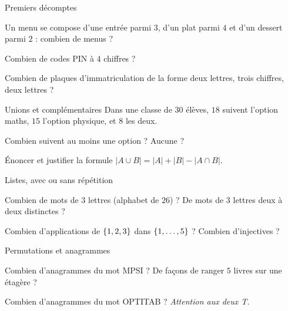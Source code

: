 \exercices
{}

\begin{exercice}[1]{Premiers décomptes}
\begin{questions}
  \item Un menu se compose d'une entrée parmi $3$, d'un plat parmi $4$ et
    d'un dessert parmi $2$ : combien de menus ?
  \item Combien de codes PIN à $4$ chiffres ?
  \item Combien de plaques d'immatriculation de la forme
    deux lettres, trois chiffres, deux lettres ?
\end{questions}
\end{exercice}

\begin{exercice}[1]{Unions et complémentaires}
Dans une classe de $30$ élèves, $18$ suivent l'option maths, $15$ l'option
physique, et $8$ les deux.
\begin{questions}
  \item Combien suivent au moins une option ? Aucune ?
  \item Énoncer et justifier la formule $|A\cup B|=|A|+|B|-|A\cap B|$.
\end{questions}
\end{exercice}

\begin{exercice}[1]{Listes, avec ou sans répétition}
\begin{questions}
  \item Combien de mots de $3$ lettres (alphabet de $26$) ? De mots de
    $3$ lettres deux à deux distinctes ?
  \item Combien d'applications de $\left\{1,2,3\right\}$ dans $\left\{1,\dots,5\right\}$ ?
    Combien d'injectives ?
\end{questions}
\end{exercice}

\begin{exercice}[1]{Permutations et anagrammes}
\begin{questions}
  \item Combien d'anagrammes du mot MPSI ? De façons de ranger $5$ livres
    sur une étagère ?
  \item Combien d'anagrammes du mot OPTITAB ? \emph{Attention aux deux T.}
\end{questions}
\end{exercice}

